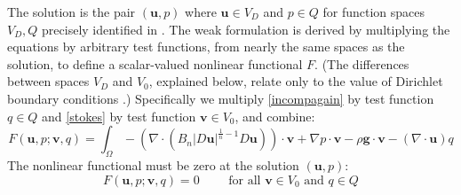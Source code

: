\documentclass[letterpaper,final,12pt,reqno]{amsart}
\newcommand{\bu}{\mathbf{u}}
\newcommand{\bv}{\mathbf{v}}
\begin{document}
The solution is the pair $(\bu,p)$ where $\bu\in V_D$ and $p \in Q$ for function spaces $V_D,Q$ precisely identified in \cite{JouvetRappaz2011}.  The weak formulation is derived by multiplying the equations by arbitrary test functions, from nearly the same spaces as the solution, to define a scalar-valued nonlinear functional $F$.  (The differences between spaces $V_D$ and $V_0$, explained below, relate only to the value of Dirichlet boundary conditions \cite{JouvetRappaz2011}.)  Specifically we multiply \eqref{incompagain} by test function $q\in Q$ and \eqref{stokes} by test function $\bv\in V_0$, and combine:
\begin{equation}
F(\bu,p;\bv,q) = \int_\Omega - \left(\nabla \cdot \left(B_n |D\bu|^{\frac{1}{n} - 1} D\bu\right)\right)\cdot \bv + \nabla p \cdot \bv - \rho \mathbf{g} \cdot \bv - \left(\nabla \cdot \bu\right) q \label{nonfuncone}
\end{equation}
The nonlinear functional must be zero at the solution $(\bu,p)$:
\begin{equation}
F(\bu,p;\bv,q) = 0 \qquad \text{ for all } \bv\in V_0 \text{ and } q\in Q
\end{equation}
\end{document}
